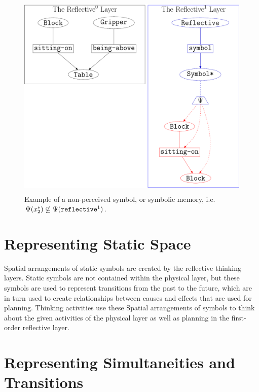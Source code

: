 \begin{figure}
\center
\includegraphics[height=10cm]{gfx/example_symbolic_memory}
\caption{Example of a non-perceived symbol, or symbolic memory,
  i.e. $\Psi(x_2^*)\not\subseteq\Psi(\text{\tt{reflective}}^1)$.}
\label{figure:example_symbolic_memory}
\end{figure}

\section{Representing Static Space}

Spatial arrangements of static symbols are created by the reflective
thinking layers.  Static symbols are not contained within the physical
layer, but these symbols are used to represent transitions from the
past to the future, which are in turn used to create relationships
between causes and effects that are used for planning.  Thinking
activities use these Spatial arrangements of symbols to think about
the given activities of the physical layer as well as planning in the
first-order reflective layer.

\section{Representing Simultaneities and Transitions}

